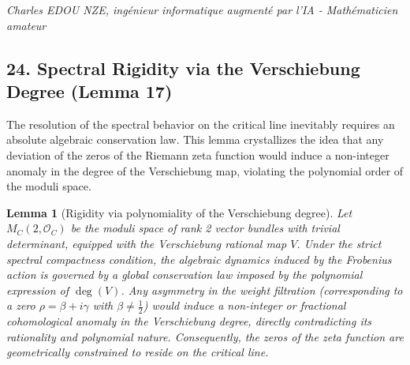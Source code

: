 \documentclass[
]{article}
\newtheorem{lemma}{Lemma}
\begin{document}
\vspace{1cm}
\begin{flushright}
\textit{Charles EDOU NZE, ingénieur informatique augmenté par l'IA - Mathématicien amateur}
\end{flushright}



\subsection{24. Spectral Rigidity via the Verschiebung Degree (Lemma 17)}
The resolution of the spectral behavior on the critical line inevitably requires an absolute algebraic conservation law. This lemma crystallizes the idea that any deviation of the zeros of the Riemann zeta function would induce a non-integer anomaly in the degree of the Verschiebung map, violating the polynomial order of the moduli space.

\begin{lemma}[Rigidity via polynomiality of the Verschiebung degree]
Let $M_C(2, \mathcal{O}_C)$ be the moduli space of rank 2 vector bundles with trivial determinant, equipped with the Verschiebung rational map $V$. Under the strict spectral compactness condition, the algebraic dynamics induced by the Frobenius action is governed by a global conservation law imposed by the polynomial expression of $\deg(V)$. Any asymmetry in the weight filtration (corresponding to a zero $\rho = \beta + i\gamma$ with $\beta \neq \frac{1}{2}$) would induce a non-integer or fractional cohomological anomaly in the Verschiebung degree, directly contradicting its rationality and polynomial nature. Consequently, the zeros of the zeta function are geometrically constrained to reside on the critical line.
\end{lemma}
\end{document}
